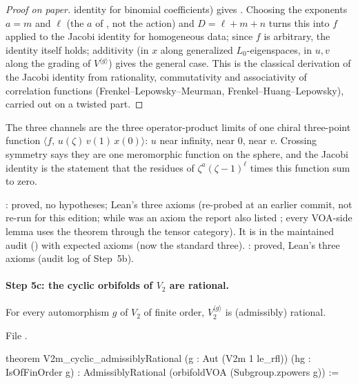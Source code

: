 \begin{proof}[Proof on paper]
identity for binomial coefficients) gives . Choosing the exponents $a=m$ and $\ell$
(the $a$ of , not the action) and $D=\ell+m+n$ turns this into $f$ applied to the Jacobi
identity for homogeneous data; since $f$ is arbitrary, the identity itself holds; additivity (in $x$ along generalized
$L_0$-eigenspaces, in $u,v$ along the grading of $V^{\langle g\rangle}$) gives the general case. This is the classical
derivation of the Jacobi identity from rationality, commutativity and associativity of correlation functions (Frenkel--Lepowsky--Meurman,
Frenkel--Huang--Lepowsky), carried out on a twisted part.
\end{proof}

\begin{physics}
The three channels are the three operator-product limits of one chiral three-point function
$\langle f,\,u(\zeta)\,v(1)\,x(0)\rangle$: $u$ near infinity, near $0$, near $v$. Crossing symmetry says they are one
meromorphic function on the sphere, and the Jacobi identity is the statement that the residues of
$\zeta^a(\zeta-1)^\ell$ times this function sum to zero.
\end{physics}

\begin{status}
: proved, no hypotheses; Lean's three axioms (re-probed at an earlier commit, not re-run for this edition; while
 was an axiom the report also listed ; every VOA-side lemma uses the theorem  through
the tensor category). It is in the maintained audit
() with expected axioms 
(now the standard three).
: proved, Lean's three axioms (audit log of Step~5b).
\end{status}

\paragraph{Step 5c: the cyclic orbifolds of $V_2$ are rational.}

\begin{theorem}\label{l22:thm:cyclic}
For every automorphism $g$ of $V_2$ of finite order, $V_2^{\langle g\rangle}$ is (admissibly) rational.
\end{theorem}
\noindent File .
\begin{leancode}
theorem V2m_cyclic_admissiblyRational (g : Aut (V2m 1 le_rfl)) (hg : IsOfFinOrder g) :
    AdmissiblyRational (orbifoldVOA (Subgroup.zpowers g)) :=
\end{leancode}

